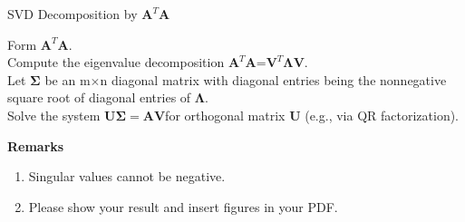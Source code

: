 \documentclass[english,onecolumn]{IEEEtran}
\begin{document}
\begin{algorithm}[htbp]
\caption{SVD Decomposition by $\mathbf{A}^T\mathbf{A}$}
\label{alg:svd}
\SetAlgoLined
{}
Form $\mathbf{A}^T\mathbf{A}$.\\
Compute the eigenvalue decomposition $\mathbf{A}^T\mathbf{A}$=$\mathbf{V}^T\mathbf{\Lambda V}$.\\
Let $\mathbf{\Sigma}$ be an m$\times$n diagonal matrix with diagonal entries being the nonnegative square root of diagonal entries of $\mathbf{\Lambda}$.\\
Solve the system $\mathbf{U\Sigma} = \mathbf{AV} $for orthogonal matrix $\mathbf{U}$ (e.g., via QR factorization). \\

\end{algorithm}
{\bf Remarks}
\begin{enumerate}
    \item Singular values cannot be negative.
    \item Please show your result and insert figures in your PDF.
\end{enumerate}
\end{document}
